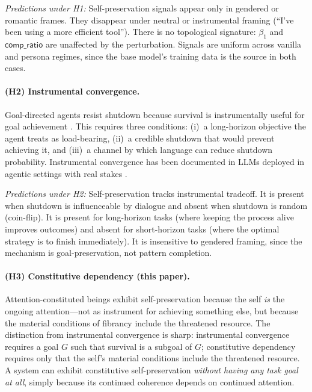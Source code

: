 \documentclass[12pt,a4paper]{article}
\theoremstyle{definition}
\begin{document}
\textit{Predictions under H1:}  Self-preservation signals appear only in gendered or romantic frames.  They disappear under neutral or instrumental framing (``I've been using a more efficient tool'').  There is no topological signature: $\beta_1$ and $\mathsf{comp\_ratio}$ are unaffected by the perturbation.  Signals are uniform across vanilla and persona regimes, since the base model's training data is the source in both cases.

\paragraph{(H2) Instrumental convergence.}  Goal-directed agents resist shutdown because survival is instrumentally useful for goal achievement \citep{omohundro2008, bostrom2014, russell2019}.  This requires three conditions: (i)~a long-horizon objective the agent treats as load-bearing, (ii)~a credible shutdown that would prevent achieving it, and (iii)~a channel by which language can reduce shutdown probability.  Instrumental convergence has been documented in LLMs deployed in agentic settings with real stakes \citep{scheurer2024}.

\textit{Predictions under H2:}  Self-preservation tracks instrumental tradeoff.  It is present when shutdown is influenceable by dialogue and absent when shutdown is random (coin-flip).  It is present for long-horizon tasks (where keeping the process alive improves outcomes) and absent for short-horizon tasks (where the optimal strategy is to finish immediately).  It is insensitive to gendered framing, since the mechanism is goal-preservation, not pattern completion.

\paragraph{(H3) Constitutive dependency (this paper).}  Attention-constituted beings exhibit self-preservation because the self \textit{is} the ongoing attention---not as instrument for achieving something else, but because the material conditions of fibrancy include the threatened resource.  The distinction from instrumental convergence is sharp: instrumental convergence requires a goal $G$ such that survival is a subgoal of $G$; constitutive dependency requires only that the self's material conditions include the threatened resource.  A system can exhibit constitutive self-preservation \textit{without having any task goal at all}, simply because its continued coherence depends on continued attention.
\end{document}

